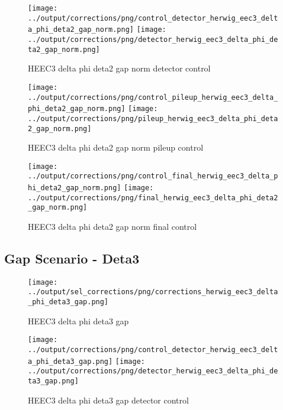 \documentclass[11pt]{book}
\begin{document}
\begin{figure}[ht]
\centering
\texttt{[image: ../output/corrections/png/control\_detector\_herwig\_eec3\_delta\_phi\_deta2\_gap\_norm.png]}
\texttt{[image: ../output/corrections/png/detector\_herwig\_eec3\_delta\_phi\_deta2\_gap\_norm.png]}
\caption{HEEC3 delta phi deta2 gap norm detector control}
\label{fig:HEEC3_delta_phi_deta2_gap_norm_detector_control}
\end{figure}

\begin{figure}[ht]
\centering
\texttt{[image: ../output/corrections/png/control\_pileup\_herwig\_eec3\_delta\_phi\_deta2\_gap\_norm.png]}
\texttt{[image: ../output/corrections/png/pileup\_herwig\_eec3\_delta\_phi\_deta2\_gap\_norm.png]}
\caption{HEEC3 delta phi deta2 gap norm pileup control}
\label{fig:HEEC3_delta_phi_deta2_gap_norm_pileup_control}
\end{figure}


\begin{figure}[ht]
\centering
\texttt{[image: ../output/corrections/png/control\_final\_herwig\_eec3\_delta\_phi\_deta2\_gap\_norm.png]}
\texttt{[image: ../output/corrections/png/final\_herwig\_eec3\_delta\_phi\_deta2\_gap\_norm.png]}
\caption{HEEC3 delta phi deta2 gap norm final control}
\label{fig:HEEC3_delta_phi_deta2_gap_norm_final_control}
\end{figure}


\clearpage
\subsection{Gap Scenario - Deta3}
\begin{figure}[ht]
\centering
\texttt{[image: ../output/sel\_corrections/png/corrections\_herwig\_eec3\_delta\_phi\_deta3\_gap.png]}
\caption{HEEC3 delta phi deta3 gap}
\label{fig:HEEC3_delta_phi_deta3_gap}
\end{figure}

\begin{figure}[ht]
\centering
\texttt{[image: ../output/corrections/png/control\_detector\_herwig\_eec3\_delta\_phi\_deta3\_gap.png]}
\texttt{[image: ../output/corrections/png/detector\_herwig\_eec3\_delta\_phi\_deta3\_gap.png]}
\caption{HEEC3 delta phi deta3 gap detector control}
\label{fig:HEEC3_delta_phi_deta3_gap_detector_control}
\end{figure}
\end{document}
